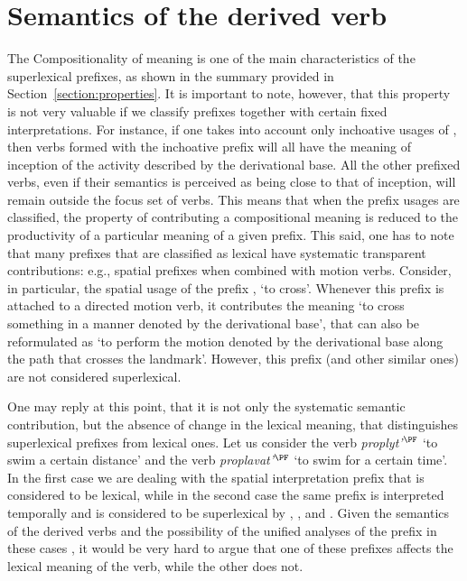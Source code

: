 \section{Semantics of the derived verb}\label{section:new:compositionality}
The Compositionality of meaning is one of the main characteristics of the superlexical prefixes, as shown in the summary provided in Section~\ref{section:properties}. It is important to note, however, that this property is not very valuable if we classify prefixes together with certain fixed interpretations. For instance, if one takes into account only inchoative usages of , then verbs formed with the inchoative prefix  will all have the meaning of inception of the activity described by the derivational base. All the other prefixed verbs, even if their semantics is perceived as being close to that of inception, will remain outside the focus set of verbs. This means that when the prefix usages are classified, the property of contributing a compositional meaning is reduced to the productivity of a particular meaning of a given prefix. This said, one has to note that many prefixes that are classified as lexical have systematic transparent contributions: e.g., spatial prefixes when combined with motion verbs. Consider, in particular, the spatial usage of the prefix , `to cross'. Whenever this prefix is attached to a directed motion verb, it contributes the meaning `to cross something in a manner denoted by the derivational base', that can also be reformulated as `to perform the motion denoted by the derivational base along the path that crosses the landmark'. However, this prefix (and other similar ones) are not considered superlexical.

One may reply at this point, that it is not only the systematic semantic contribution, but the absence of change in the lexical meaning, that distinguishes superlexical prefixes from lexical ones. Let us consider the verb \textit{proplyt'}$^{\PF}$ `to swim a certain distance' and the verb \textit{proplavat'}$^{\PF}$ `to swim for a certain time'. In the first case we are dealing with the spatial interpretation prefix  that is considered to be lexical, while in the second case the same prefix is interpreted temporally and is considered to be superlexical by \citet{Babko-Malaya:99}, \citet{Svenonius:04a}, and \citet{Svenonius:12}. Given the semantics of the derived verbs and the possibility of the unified analyses of the prefix  in these cases \citep{Kagan:book, ZinovaOsswald:paper}, it would be very hard to argue that one of these prefixes affects the lexical meaning of the verb, while the other does not. 

